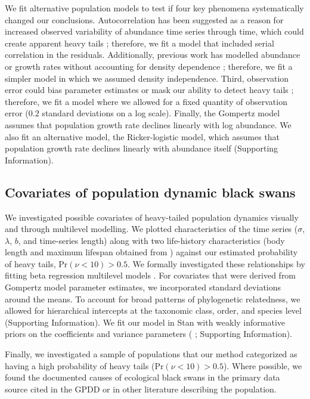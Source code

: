 We fit alternative population models to test if four key phenomena systematically changed our conclusions. Autocorrelation has been suggested as a reason for increased observed variability of abundance time series through time, which could create apparent heavy tails \citep{inchausti2002}; therefore, we fit a model that included serial correlation in the residuals. Additionally, previous work has modelled abundance or growth rates without accounting for density dependence \citep{halley2002,segura2013}; therefore, we fit a simpler model in which we assumed density independence. Third, observation error could bias parameter estimates \citep{knape2012} or mask our ability to detect heavy tails \citep{ward2007}; therefore, we fit a model where we allowed for a fixed quantity of observation error ($0.2$ standard deviations on a log scale). Finally, the Gompertz model assumes that population growth rate declines linearly with log abundance. We also fit an alternative model, the Ricker-logistic model, which assumes that population growth rate declines linearly with abundance itself (Supporting Information).

\subsection{Covariates of population dynamic black swans}

We investigated possible covariates of heavy-tailed population dynamics visually and through multilevel modelling. We plotted characteristics of the time series ($\sigma$, $\lambda$, $b$, and time-series length) along with two life-history characteristics (body length and maximum lifespan obtained from \citet{brook2006a}) against our estimated probability of heavy tails, Pr$(\nu < 10) > 0.5$. We formally investigated these relationships by fitting beta regression multilevel models \citep{ferrari2004}. For covariates that were derived from Gompertz model parameter estimates, we incorporated standard deviations around the means. To account for broad patterns of phylogenetic relatedness, we allowed for hierarchical intercepts at the taxonomic class, order, and species level (Supporting Information). We fit our model in Stan with weakly informative priors on the coefficients \citep{gelman2008d} and variance parameters (\citeauthor{gelman2006c} \citeyear{gelman2006c} \citeauthor{gelman2014} \citeyear{gelman2014}; Supporting Information).

Finally, we investigated a sample of populations that our method categorized as having a high probability of heavy tails (Pr$(\nu < 10) > 0.5$). Where possible, we found the documented causes of ecological black swans in the primary data source cited in the GPDD or in other literature describing the population.

